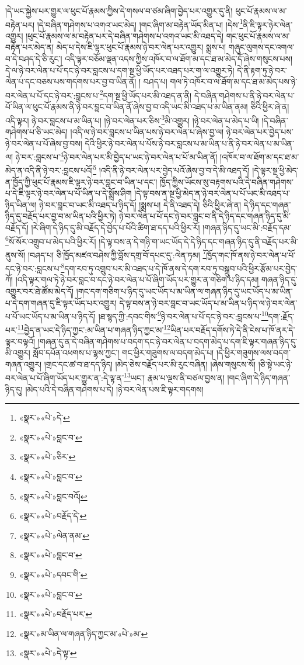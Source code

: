 །དེ་ཡང་སྐྱེས་པར་གྱུར་ལ་ཕུང་པོ་རྣམས་ཀྱིས་དེ་གསལ་བ་ཙམ་ཞིག་བྱེད་པར་འགྱུར་དུ་ནི། ཕུང་པོ་རྣམས་ལ་མ་བརྟེན་པར། །དེ་བཞིན་གཤེགས་པ་འགའ་ཡང་མེད། །གང་ཞིག་མ་བརྟེན་ཡོད་མིན་པ། །དེས་\footnote{«སྣར་»«པེ་»དེ་}ནི་ཇི་ལྟར་ཉེར་ལེན་འགྱུར། །ཕུང་པོ་རྣམས་ལ་མ་བརྟེན་པར་དེ་བཞིན་གཤེགས་པ་འགའ་ཡང་མི་འཐད་དེ། གང་ཕུང་པོ་རྣམས་ལ་མ་བརྟེན་པར་མེད་ན། མེད་པ་དེས་ཇི་ལྟར་ཕུང་པོ་རྣམས་ཉེ་བར་ལེན་པར་འགྱུར། སྨྲས་པ། གཞུང་ལུགས་དང་འགལ་བ་དེ་བཤད་དེ་ཅི་རུང་། འདི་ལྟར་བཅོམ་ལྡན་འདས་ཀྱིས་འཁོར་བ་ལ་ཐོག་མ་དང་ཐ་མ་མེད་དོ་ཞེས་གསུངས་པས། དེ་ལ་ཉེ་བར་ལེན་པ་པོ་དང་ཉེ་བར་བླངས་པ་དག་སྔ་ཕྱི་ཡོད་པར་འཐད་པར་ག་ལ་འགྱུར་ཏེ། དེ་ནི་རྟག་ཏུ་ཉེ་བར་ལེན་པ་དང་བཅས་པས་གདགས་པར་བྱ་བ་ཡིན་ནོ། །
བཤད་པ། གལ་ཏེ་འཁོར་བ་ལ་ཐོག་མ་དང་ཐ་མ་མེད་པས་ཉེ་བར་ལེན་པ་པོ་དང་ཉེ་བར་:བླངས་པ་\footnote{«སྣར་»«པེ་»བླང་བ་}དག་སྔ་ཕྱི་ཡོད་པར་མི་འཐད་ན་ནི། དེ་བཞིན་གཤེགས་པ་ནི་ཉེ་བར་ལེན་པ་པོ་ཡིན་ལ་ཕུང་པོ་རྣམས་ནི་ཉེ་བར་བླང་བ་ཡིན་ནོ་ཞེས་བྱ་བ་འདི་ཡང་མི་འཐད་པ་མ་ཡིན་ནམ། ཅིའི་ཕྱིར་ཞེ་ན། འདི་ལྟར། ཉེ་བར་བླངས་པ་མ་ཡིན་པ། །ཉེ་བར་ལེན་པར་ཅིས་\footnote{«སྣར་»«པེ་»ཅིར་}མི་འགྱུར། །ཉེ་བར་ལེན་པ་མེད་པ་ཡི། །དེ་བཞིན་གཤེགས་པ་ཅི་ཡང་མེད། །འདི་ལ་ཉེ་བར་བླངས་པ་ཡིན་པས་ཉེ་བར་ལེན་པ་ཞེས་བྱ་ལ། ཉེ་བར་ལེན་པར་བྱེད་པས་ཉེ་བར་ལེན་པ་པོ་ཞེས་བྱ་བས། དེའི་ཕྱིར་ཉེ་བར་ལེན་པ་པོས་ཉེ་བར་བླངས་པ་མ་ཡིན་པ་ནི་ཉེ་བར་ལེན་པ་མ་ཡིན་ལ། ཉེ་བར་:བླངས་པ་\footnote{«སྣར་»«པེ་»བླང་བ་}ཉེ་བར་ལེན་པར་མི་བྱེད་པ་ཡང་ཉེ་བར་ལེན་པ་པོ་མ་ཡིན་ནོ། །འཁོར་བ་ལ་ཐོག་མ་དང་ཐ་མ་མེད་ན་འདི་ནི་ཉེ་བར་:བླངས་པའོ།\footnote{«སྣར་»«པེ་»བླང་བའོ།} །འདི་ནི་ཉེ་བར་ལེན་པར་བྱེད་པའོ་ཞེས་བྱ་བ་དེ་མི་འཐད་དོ། །དེ་ལྟར་སྔ་ཕྱི་མེད་ན་ཁྱོད་ཀྱི་ཕུང་པོ་རྣམས་ཇི་ལྟར་ཉེ་བར་བླང་བ་ཡིན་པ་དང་། ཁྱོད་ཀྱིས་ཡོངས་སུ་བརྟགས་པའི་དེ་བཞིན་གཤེགས་པ་དེ་ཇི་ལྟར་ཉེ་བར་ལེན་པ་པོ་ཡིན་པ་དེ་སྨྲོས་ཤིག །དེ་ལྟ་བས་ན་སྔ་ཕྱི་མེད་ན་ཉེ་བར་ལེན་པ་པོ་ཡང་མི་འཐད་པ་ཉིད་ཡིན་ལ། ཉེ་བར་བླང་བ་ཡང་མི་འཐད་པ་ཉིད་དོ། །སྨྲས་པ། དེ་ནི་འཐད་དེ། ཅིའི་ཕྱིར་ཞེ་ན། དེ་ཉིད་དང་གཞན་ཉིད་དུ་བརྗོད་པར་བྱ་བ་མ་ཡིན་པའི་ཕྱིར་ཏེ། ཉེ་བར་ལེན་པ་པོ་དང་ཉེ་བར་བླང་བ་ནི་དེ་ཉིད་དང་གཞན་ཉིད་དུ་མི་བརྗོད་དོ། །རེ་ཞིག་དེ་ཉིད་དུ་མི་བརྗོད་དེ་བྱེད་པ་པོའི་ཚིག་ཐ་དད་པའི་ཕྱིར་རོ། །གཞན་ཉིད་དུ་ཡང་མི་:བརྗོད་དམ་\footnote{«སྣར་»«པེ་»བརྗོད་དེ་}སོ་སོར་འགྲུབ་པ་མེད་པའི་ཕྱིར་རོ། །དེ་ལྟ་བས་ན་དེ་གཉི་ག་ཡང་ཡོད་དེ་དེ་ཉིད་དང་གཞན་ཉིད་དུ་ནི་བརྗོད་པར་མི་ནུས་སོ། །བཤད་པ། ཅི་ཁྱོད་མཛའ་བཤེས་ཀྱི་བློས་དགྲ་བོ་དཔང་དུ་:ལེན་ཏམ། \footnote{«སྣར་»«པེ་»ལེན་ནམ་}ཁྱོད་གང་ཁོ་ནས་ཉེ་བར་ལེན་པ་པོ་དང་ཉེ་བར་:བླངས་པ་\footnote{«སྣར་»«པེ་»བླང་བ་}དག་རབ་ཏུ་འགྲུབ་པར་མི་འཐད་པ་དེ་ཁོ་ནས་དེ་དག་རབ་ཏུ་བསྒྲུབ་པའི་ཕྱིར་རྩོམ་པར་བྱེད་ཀོ། །འདི་ལྟར་གལ་ཏེ་ཉེ་བར་བླང་བ་དང་ཉེ་བར་ལེན་པ་པོ་ཞིག་ཡོད་པར་གྱུར་ན་གཅིག་པ་ཉིད་དམ། གཞན་ཉིད་དུ་འགྱུར་བར་ཐེ་ཚོམ་མེད་དོ། །གང་དག་གཅིག་པ་ཉིད་དུ་ཡང་ཡོད་པ་མ་ཡིན་ལ་གཞན་ཉིད་དུ་ཡང་ཡོད་པ་མ་ཡིན་པ་དེ་དག་གཞན་དུ་ཇི་ལྟར་ཡོད་པར་འགྱུར། དེ་ལྟ་བས་ན་ཉེ་བར་བླང་བ་ཡང་ཡོད་པ་མ་ཡིན་པ་ཉིད་ལ་ཉེ་བར་ལེན་པ་པོ་ཡང་ཡོད་པ་མ་ཡིན་པ་ཉིད་དོ། །ཐ་སྙད་ཀྱི་:དབང་གིས་\footnote{«སྣར་»«པེ་»དབང་གི་}ཉེ་བར་ལེན་པ་པོ་དང་ཉེ་བར་:བླངས་པ་\footnote{«སྣར་»«པེ་»བླང་བ་}དག་:རྗོད་པར་\footnote{«སྣར་»«པེ་»བརྗོད་པར་}བྱེད་ན་ཡང་དེ་ཉིད་ཀྱང་:མ་ཡིན་པ་གཞན་ཉིད་ཀྱང་མ་\footnote{«སྣར་»མ་ཡིན་ལ་གཞན་ཉིད་ཀྱང་མ་«པེ་»མ་}ཡིན་པར་བརྗོད་དགོས་ཏེ་དེ་ནི་ངེས་པ་ཁོ་ནར་དེ་ལྟར་བལྟའོ། །གཞན་དུ་ན་དེ་བཞིན་གཤེགས་པ་བདག་དང་ཉེ་བར་ལེན་པ་བདག་མེད་པ་དག་ཇི་ལྟར་གཞན་ཉིད་དུ་མི་འགྱུར། སློབ་དཔོན་འཕགས་པ་ལྷས་ཀྱང་། གང་ཕྱིར་གཟུགས་ལ་བདག་མེད་པ། །དེ་ཕྱིར་གཟུགས་ལས་བདག་གཞན་འགྱུར། །གྲང་དང་ཚ་བ་ཐ་དད་ཉིད། །མེད་ཅེས་བརྗོད་པར་མི་རུང་བཞིན། །ཞེས་གསུངས་སོ། །ཅི་སྟེ་ཡང་ཉེ་བར་ལེན་པ་པོ་ཞིག་ཡོད་པར་གྱུར་ན་:དེ་ལྟ་ན་\footnote{«སྣར་»«པེ་»དེ་ལྟ་}ཡང་། རྣམ་པ་ལྔས་ནི་བཙལ་བྱས་ན། །གང་ཞིག་དེ་ཉིད་གཞན་ཉིད་དུ། །མེད་པའི་དེ་བཞིན་གཤེགས་པ་དེ། །ཉེ་བར་ལེན་པས་ཇི་ལྟར་གདགས། 